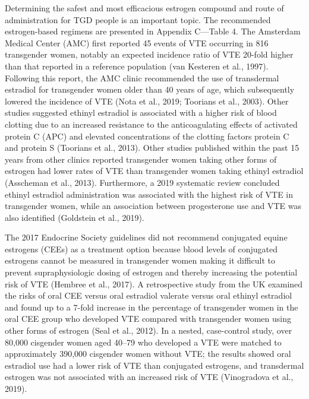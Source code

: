 \documentclass[
]{book}
\begin{document}
Determining the safest and most efficacious
estrogen compound and route of administration
for TGD people is an important topic. The recommended estrogen-based regimens are presented
in Appendix C---Table 4. The Amsterdam Medical
Center (AMC) first reported 45 events of VTE
occurring in 816 transgender women, notably an
expected incidence ratio of VTE 20-fold higher
than that reported in a reference population (van
Kesteren et al., 1997). Following this report, the
AMC clinic recommended the use of transdermal
estradiol for transgender women older than 40
years of age, which subsequently lowered the
incidence of VTE (Nota et al., 2019; Toorians
et al., 2003). Other studies suggested ethinyl
estradiol is associated with a higher risk of blood
clotting due to an increased resistance to the
anticoagulating effects of activated protein C
(APC) and elevated concentrations of the clotting
factors protein C and protein S (Toorians et al.,
2013). Other studies published within the past
15 years from other clinics reported transgender
women taking other forms of estrogen had lower
rates of VTE than transgender women taking
ethinyl estradiol (Asscheman et al., 2013).
Furthermore, a 2019 systematic review concluded
ethinyl estradiol administration was associated
with the highest risk of VTE in transgender
women, while an association between progesterone use and VTE was also identified (Goldstein
et al., 2019).

The 2017 Endocrine Society guidelines did not
recommend conjugated equine estrogens (CEEs)
as a treatment option because blood levels of
conjugated estrogens cannot be measured in
transgender women making it difficult to prevent
supraphysiologic dosing of estrogen and thereby
increasing the potential risk of VTE (Hembree
et al., 2017). A retrospective study from the UK
examined the risks of oral CEE versus oral estradiol valerate versus oral ethinyl estradiol and
found up to a 7-fold increase in the percentage
of transgender women in the oral CEE group
who developed VTE compared with transgender
women using other forms of estrogen (Seal et al.,
2012). In a nested, case-control study, over 80,000
cisgender women aged 40--79 who developed a
VTE were matched to approximately 390,000 cisgender women without VTE; the results showed
oral estradiol use had a lower risk of VTE than
conjugated estrogens, and transdermal estrogen
was not associated with an increased risk of VTE
(Vinogradova et al., 2019).
\end{document}

